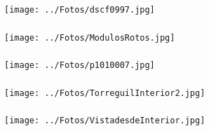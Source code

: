 \documentclass[xcolor=dvipsnames]{beamer}
\begin{document}
\begin{frame}[plain]
  \frametitle{}

  \noindent \begin{center}
    \texttt{[image: ../Fotos/dscf0997.jpg]}
    \par\end{center}


\end{frame}

\begin{frame}[plain]
  \frametitle{}

  \noindent \begin{center}
    \texttt{[image: ../Fotos/ModulosRotos.jpg]}
    \par\end{center}


\end{frame}

\begin{frame}[plain]
  \frametitle{}

  \noindent \begin{center}
    \texttt{[image: ../Fotos/p1010007.jpg]}
    \par\end{center}


\end{frame}





\begin{frame}[plain]
  \frametitle{}

  \noindent \begin{center}
    \texttt{[image: ../Fotos/TorreguilInterior2.jpg]}
    \par\end{center}


\end{frame}

\begin{frame}[plain]
  \frametitle{}

  \noindent \begin{center}
    \texttt{[image: ../Fotos/VistadesdeInterior.jpg]}
    \par\end{center}


\end{frame}
\end{document}
